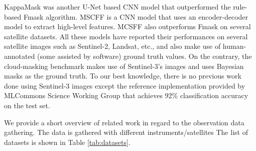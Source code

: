 \documentclass[sigplan,screen]{acmart}
\begin{document}
KappaMask \cite{Domnich2021KappaMaskAC} was another U-Net based CNN model that outperformed the rule-based Fmask algorithm. MSCFF \cite{Li2019DeepLB} is a CNN model that uses an encoder-decoder model to extract high-level features. MCSFF also outperforms Fmask on several satellite datasets. All these models have reported their performances on several satellite images such as Sentinel-2, Landsat, etc., and also make use of human-annotated (some assisted by software) ground truth values. On the contrary, the cloud-masking benchmark makes use of Sentinel-3's images and uses Bayesian masks as the ground truth. To our best knowledge, there is no previous work done using Sentinel-3 images except the reference implementation provided by MLCommons Science Working Group that achieves 92\% classification accuracy on the test set.

We provide a short overview of related work in regard to the observation data gathering. The data is gathered with different instruments/satellites  The list of datasets is shown in Table \ref{tab:datasets}. 

\begin{table}[htb]
    \centering
    \caption{This table presents the several methods used for cloud masking with their respective dataset, ground truth, and performance.}
    \label{tab:datasets}

\end{table}
\end{document}
